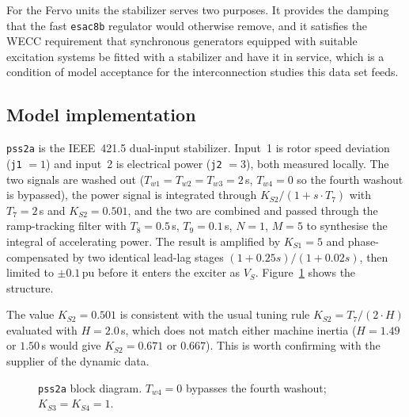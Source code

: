 For the Fervo units the stabilizer serves two purposes. It provides the damping that
the fast \texttt{esac8b} regulator would otherwise remove, and it satisfies the WECC
requirement that synchronous generators equipped with suitable excitation systems be
fitted with a stabilizer and have it in service, which is a condition of model
acceptance for the interconnection studies this data set feeds.

\subsection{Model implementation}

\texttt{pss2a} is the IEEE~421.5 dual-input stabilizer. Input~1 is rotor speed
deviation (\texttt{j1} $= 1$) and input~2 is electrical power (\texttt{j2} $= 3$),
both measured locally. The two signals are washed out ($T_{w1} = T_{w2} = T_{w3} =
2$\,s, $T_{w4} = 0$ so the fourth washout is bypassed), the power signal is integrated
through $K_{S2}/(1 + s \cdot T_7)$ with $T_7 = 2$\,s and $K_{S2} = 0.501$, and the two
are combined and passed through the ramp-tracking filter with $T_8 = 0.5$\,s,
$T_9 = 0.1$\,s, $N = 1$, $M = 5$ to synthesise the integral of accelerating power.
The result is amplified by $K_{S1} = 5$ and phase-compensated by two identical
lead-lag stages $(1 + 0.25 s)/(1 + 0.02 s)$, then limited to $\pm0.1$\,pu before it
enters the exciter as $V_S$. Figure~\ref{fig:pss2a} shows the structure.

The value $K_{S2} = 0.501$ is consistent with the usual tuning rule
$K_{S2} = T_7 / (2 \cdot H)$ evaluated with $H = 2.0$\,s, which does not match either
machine inertia ($H = 1.49$ or $1.50$\,s would give $K_{S2} = 0.671$ or $0.667$). This
is worth confirming with the supplier of the dynamic data.

\begin{figure}[!ht]
\centering
\resizebox{\linewidth}{!}{}
\caption{\texttt{pss2a} block diagram. $T_{w4} = 0$ bypasses the fourth washout; $K_{S3} = K_{S4} = 1$.}
\label{fig:pss2a}
\end{figure}

\begin{table}[!ht]
\centering

\caption{\texttt{pss2a} parameters (common to all nine units).}
\label{tab:pss2a}
\end{table}
